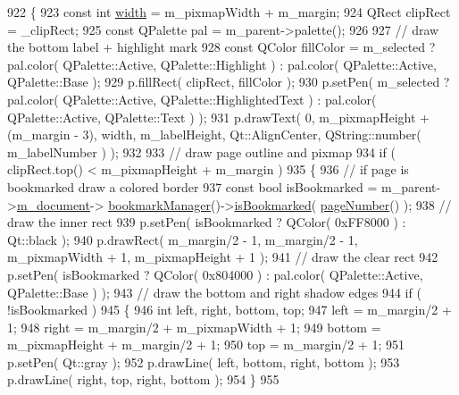 \begin{DoxyCode}
922 \{
923     \textcolor{keyword}{const} \textcolor{keywordtype}{int} \hyperlink{classThumbnailWidget_ae49f53a3dd4b131ac08f0a8e96df08a2}{width} = m\_pixmapWidth + m\_margin;
924     QRect clipRect = \_clipRect;
925     \textcolor{keyword}{const} QPalette pal = m\_parent->palette();
926 
927     \textcolor{comment}{// draw the bottom label + highlight mark}
928     \textcolor{keyword}{const} QColor fillColor = m\_selected ? pal.color( QPalette::Active, QPalette::Highlight ) : pal.color( 
      QPalette::Active, QPalette::Base );
929     p.fillRect( clipRect, fillColor );
930     p.setPen( m\_selected ? pal.color( QPalette::Active, QPalette::HighlightedText ) : pal.color( 
      QPalette::Active, QPalette::Text ) );
931     p.drawText( 0, m\_pixmapHeight + (m\_margin - 3), width, m\_labelHeight, Qt::AlignCenter, QString::number(
       m\_labelNumber ) );
932 
933     \textcolor{comment}{// draw page outline and pixmap}
934     \textcolor{keywordflow}{if} ( clipRect.top() < m\_pixmapHeight + m\_margin )
935     \{
936         \textcolor{comment}{// if page is bookmarked draw a colored border}
937         \textcolor{keyword}{const} \textcolor{keywordtype}{bool} isBookmarked = m\_parent->\hyperlink{classThumbnailListPrivate_ae19b3e09f87437e8d485d0e039a52b08}{m\_document}->
      \hyperlink{classOkular_1_1Document_a2a2a1f0f5384563c8b24c2ba48809839}{bookmarkManager}()->\hyperlink{classOkular_1_1BookmarkManager_a606808f318c721de3e0d4954e7f84a35}{isBookmarked}( \hyperlink{classThumbnailWidget_a1f2c0aa21032cb62975ce0f77e9e4ee3}{pageNumber}() );
938         \textcolor{comment}{// draw the inner rect}
939         p.setPen( isBookmarked ? QColor( 0xFF8000 ) : Qt::black );
940         p.drawRect( m\_margin/2 - 1, m\_margin/2 - 1, m\_pixmapWidth + 1, m\_pixmapHeight + 1 );
941         \textcolor{comment}{// draw the clear rect}
942         p.setPen( isBookmarked ? QColor( 0x804000 ) : pal.color( QPalette::Active, QPalette::Base ) );
943         \textcolor{comment}{// draw the bottom and right shadow edges}
944         \textcolor{keywordflow}{if} ( !isBookmarked )
945         \{
946             \textcolor{keywordtype}{int} left, right, bottom, top;
947             left = m\_margin/2 + 1;
948             right = m\_margin/2 + m\_pixmapWidth + 1;
949             bottom = m\_pixmapHeight + m\_margin/2 + 1;
950             top = m\_margin/2 + 1;
951             p.setPen( Qt::gray );
952             p.drawLine( left, bottom, right, bottom );
953             p.drawLine( right, top, right, bottom );
954         \}
955 

\end{DoxyCode}
